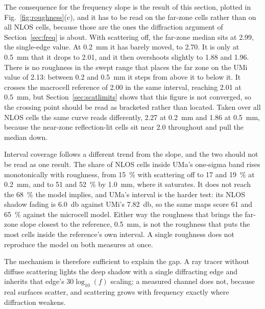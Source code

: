 \documentclass[conference]{IEEEtran}
\begin{document}
The consequence for the frequency slope is the result of this section, plotted
in Fig.~\ref{fig:roughness}(c), and it has to be read on the far-zone cells rather than on all NLOS cells, because
those are the ones the diffraction argument of Section~\ref{sec:freq} is
about. With scattering off, the far-zone median sits at \num{2.99}, the
single-edge value. At \SI{0.2}{\milli\metre} it has barely moved, to
\num{2.70}. It is only at \SI{0.5}{\milli\metre} that it drops to
\num{2.01}, and it then overshoots slightly to \num{1.88} and \num{1.96}.
There is no roughness in the swept range that places the far zone on the
UMi value of \num{2.13}: between \SI{0.2}{} and \SI{0.5}{\milli\metre} it
steps from above it to below it. It crosses the macrocell reference of
\num{2.00} in the same interval, reaching \num{2.01} at
\SI{0.5}{\milli\metre}, but Section~\ref{sec:scatlimits} shows that this
figure is not converged, so the crossing point should be read as bracketed
rather than located. Taken over all NLOS cells the same curve reads
differently, \num{2.27} at \SI{0.2}{\milli\metre} and \num{1.86} at
\SI{0.5}{\milli\metre}, because the near-zone reflection-lit cells sit near
\num{2.0} throughout and pull the median down.

Interval coverage follows a different trend from the slope, and the two should
not be read as one result. The share of NLOS cells inside UMa's one-sigma band
rises monotonically with roughness, from \SI{15}{\percent} with scattering
off to \SI{17}{} and \SI{19}{\percent} at \SI{0.2}{\milli\metre}, and to
\SI{51}{} and \SI{52}{\percent} by \SI{1.0}{\milli\metre}, where it
saturates. It does not reach the \SI{68}{\percent} the model implies, and
UMa's interval is the harder test: its NLOS shadow fading is
\SI{6.0}{\decibel} against UMi's \SI{7.82}{\decibel}, so the same maps score
\SI{61}{} and \SI{65}{\percent} against the microcell model. Either way the
roughness that brings the far-zone slope closest to the reference,
\SI{0.5}{\milli\metre}, is not the roughness that puts the most cells inside
the reference's own interval. A single roughness does not reproduce the model
on both measures at once.

The mechanism is therefore sufficient to explain the gap. A ray tracer without
diffuse scattering lights the deep shadow with a single diffracting edge and
inherits that edge's $30\log_{10}(f)$ scaling; a measured channel does not,
because real surfaces scatter, and scattering grows with frequency exactly
where diffraction weakens.
\end{document}
